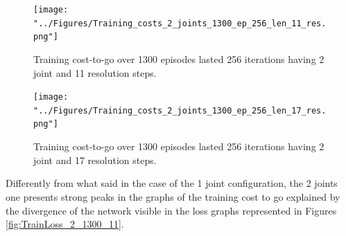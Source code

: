 \documentclass[twocolumn, a4paper]{article}
\begin{document}
\begin{figure}[H]
	\centering
	\texttt{[image: "../Figures/Training\_costs\_2\_joints\_1300\_ep\_256\_len\_11\_res.png"]}
	\caption{Training cost-to-go over 1300 episodes lasted 256 iterations having 2
			 joint and 11 resolution steps.}
	\label{fig:Train_cost_to_go_2_1300_11}
\end{figure}
\vspace{-1cm}

\begin{figure}[H]
	\centering
	\texttt{[image: "../Figures/Training\_costs\_2\_joints\_1300\_ep\_256\_len\_17\_res.png"]}
	\caption{Training cost-to-go over 1300 episodes lasted 256 iterations having 2
			 joint and 17 resolution steps.}
	\label{fig:Train_cost_to_go_2_1300_17}
\end{figure}

Differently from what said in the case of the 1 joint configuration,
the 2 joints one presents strong peaks in the graphs of the training cost to go
explained by the divergence of the network visible in the loss graphs 
represented in Figures \ref{fig:TrainLoss_2_1300_11}.
\end{document}
